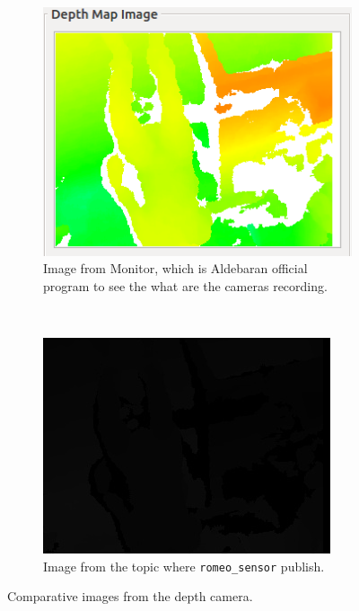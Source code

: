 \documentclass[12pt,a4paper,final,twoside,openright]{report}
\begin{document}
\begin{figure}[h]
\begin{subfigure}[r]{0.48\textwidth}
\centering
		\includegraphics[width=\textwidth]{images/depth_camera_monitor.png}
        \caption{Image from Monitor, which is Aldebaran official program to see the what are the cameras recording.}
\end{subfigure}
~
\begin{subfigure}[r]{0.48\textwidth}
\centering
		\includegraphics[width=\textwidth]{images/depth_camera_ROS.jpg}
        \caption{Image from the topic where \texttt{romeo\_sensor} publish.}
\end{subfigure}
\caption{Comparative images from the depth camera.\label{fig:ros_dark_depth_image}}
\end{figure}
\end{document}
